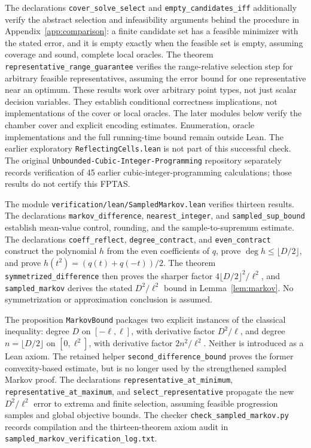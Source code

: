 \documentclass[11pt]{article}
\theoremstyle{definition}\newtheorem{definition}{Definition}[section]
\theoremstyle{remark}\newtheorem{remark}[theorem]{Remark}
\begin{document}
The declarations \texttt{cover\_solve\_select} and \texttt{empty\_candidates\_iff} additionally verify the abstract selection and infeasibility arguments behind the procedure in Appendix~\ref{app:comparison}: a finite candidate set has a feasible minimizer with the stated error, and it is empty exactly when the feasible set is empty, assuming coverage and sound, complete local oracles. The theorem \texttt{representative\_range\_guarantee} verifies the range-relative selection step for arbitrary feasible representatives, assuming the error bound for one representative near an optimum. These results work over arbitrary point types, not just scalar decision variables. They establish conditional correctness implications, not implementations of the cover or local oracles. The later modules below verify the chamber cover and explicit encoding estimates. Enumeration, oracle implementations and the full running-time bound remain outside Lean. The earlier exploratory \texttt{ReflectingCells.lean} is not part of this successful check. The original \texttt{Unbounded-Cubic-Integer-Programming} repository separately records verification of 45 earlier cubic-integer-programming calculations; those results do not certify this FPTAS.

The module \texttt{verification/lean/SampledMarkov.lean} verifies thirteen results. The declarations \texttt{markov\_difference}, \texttt{nearest\_integer}, and \texttt{sampled\_sup\_bound} establish mean-value control, rounding, and the sample-to-supremum estimate. The declarations \texttt{coeff\_reflect}, \texttt{degree\_contract}, and \texttt{even\_contract} construct the polynomial $h$ from the even coefficients of $q$, prove $\deg h\le\lfloor D/2\rfloor$, and prove $h(t^2)=(q(t)+q(-t))/2$. The theorem \texttt{symmetrized\_difference} then proves the sharper factor $4\lfloor D/2\rfloor^2/\ell^2$, and \texttt{sampled\_markov} derives the stated $D^2/\ell^2$ bound in Lemma~\ref{lem:markov}. No symmetrization or approximation conclusion is assumed.

The proposition \texttt{MarkovBound} packages two explicit instances of the classical inequality: degree $D$ on $[-\ell,\ell]$, with derivative factor $D^2/\ell$, and degree $n=\lfloor D/2\rfloor$ on $[0,\ell^2]$, with derivative factor $2n^2/\ell^2$. Neither is introduced as a Lean axiom. The retained helper \texttt{second\_difference\_bound} proves the former convexity-based estimate, but is no longer used by the strengthened sampled Markov proof. The declarations \texttt{representative\_at\_minimum}, \texttt{representative\_at\_maximum}, and \texttt{select\_representative} propagate the new $D^2/\ell^2$ error to extrema and finite selection, assuming feasible progression samples and global objective bounds. The checker \texttt{check\_sampled\_markov.py} records compilation and the thirteen-theorem axiom audit in \texttt{sampled\_markov\_verification\_log.txt}.
\end{document}

